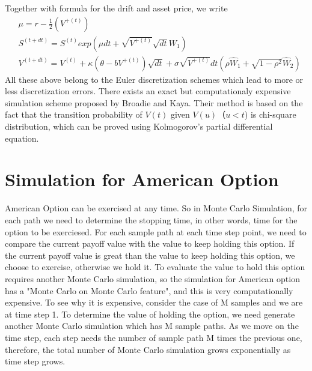 \documentclass[a4paper]{article}
\begin{document}
Together with formula for the drift and asset price, we write
\begin{align*}
	& \mu = r - \frac{1}{2} (V^{+(t)})\\
	& S^{(t + dt)} = S^{(t)}exp(\mu dt + \sqrt{V^{+(t)}} \sqrt{dt} W_1) \\
	& V^{(t + dt)} = V^{(t)} + \kappa (\theta - b V^{+(t)}) \sqrt{dt} + \sigma \sqrt{V^{+(t)}} dt (\rho \hat W_1
	+ \sqrt{1 - \rho^2} \hat W_2) 
\end{align*}
All these above belong to the Euler discretization schemes which lead to more or less discretization errors. There exists an exact but computationaly expensive simulation scheme proposed by Broadie and Kaya\cite{exact_heston}. Their method is based on the fact that the transition probability of $V(t)$ given $V(u)$（$u < t$) is chi-square distribution, which can be proved using Kolmogorov's partial differential equation.\\ %

\section{Simulation for American Option}
American Option can be exercised at any time. So in Monte Carlo Simulation, for each path we need to determine the stopping time, in other words, time for the option to be exerciesed. For each sample path at each time step point, we need to compare the current payoff value with the value to keep holding this option. If the current payoff value is great than the value to keep holding this option, we choose to exercise, otherwise we hold it. To evaluate the value to hold this option requires another Monte Carlo simulation, so the simulation for American option has a "Monte Carlo on Monte Carlo feature", and this is very computationally expensive. To see why it is expensive, consider the case of M samples and we are at time step 1. To determine the value of holding the option, we need generate another Monte Carlo simulation which has M sample paths. As we move on the time step, each step needs the number of sample path M times the previous one, therefore, the total number of Monte Carlo simulation grows exponentially as time step grows. 
\end{document}
